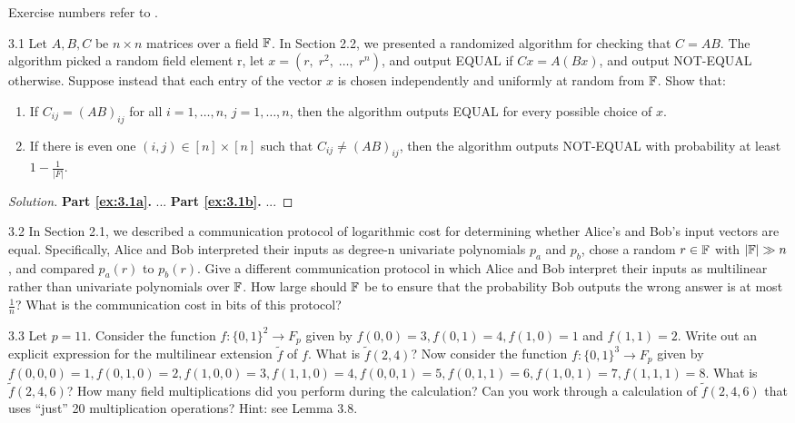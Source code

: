 
Exercise numbers refer to \cite{thaler2022pazk}.

\begin{exercise}{3.1}\label{ex:3.1}
    Let $A,B,C$ be $n \times n$ matrices over a field $\mathbb{F}$. In Section 2.2, we presented a randomized algorithm for checking that $C = AB$. The algorithm picked a random field element r, let $x = (r,\; r^2,\; \ldots,\; r^n)$, and output EQUAL if $Cx = A(Bx)$, and output NOT-EQUAL otherwise.
    Suppose instead that each entry of the vector $x$ is chosen independently and uniformly at random from $\mathbb{F}$. 
    Show that:
    \begin{enumerate}[label=(\alph*)]

        \item\label{ex3.1a} If $C_{ij} = (AB)_{ij}$ for all $i = 1, \ldots, n$, $j = 1, \ldots, n$,
            then the algorithm outputs EQUAL for every possible choice of $x$.
        \item\label{ex3.1b} If there is even one $(i,j) \in [n] \times [n]$ such that
            $C_{ij} \neq (AB)_{ij}$, then the algorithm outputs NOT-EQUAL with
            probability at least $1 - \frac{1}{|F|}$.
    \end{enumerate}
\end{exercise}

\begin{proof}[Solution]
    \textbf{Part \ref{ex:3.1a}.} ...
    \textbf{Part \ref{ex:3.1b}.} ...
\end{proof}

\begin{exercise}{3.2}\label{ex:3.2}
    In Section 2.1, we described a communication protocol of logarithmic cost for determining
    whether Alice’s and Bob’s input vectors are equal. Specifically, Alice and Bob interpreted their inputs as
    degree-n univariate polynomials $p_a$ and $p_b$, chose a random $r \in \mathbb{F}$ with $|\mathbb{F}| \gg n$, and compared $p_a(r)$ to
    $p_b(r)$. Give a different communication protocol in which Alice and Bob interpret their inputs as multilinear
    rather than univariate polynomials over $\mathbb{F}$. How large should $\mathbb{F}$ be to ensure that the probability Bob outputs
    the wrong answer is at most $\frac{1}{n}$? What is the communication cost in bits of this protocol?
\end{exercise}

\begin{exercise}{3.3}\label{ex:3.3}
    Let $p = 11$. Consider the function $f: \{0,1\}^2 \to F_p$ given by $f(0,0) = 3, f(0,1) = 4, f(1,0) = 1$ and $f(1,1) = 2$. 
    Write out an explicit expression for the multilinear extension $\tilde{f}$ of $f$. What is $\tilde{f}(2,4)$?
    Now consider the function $f: \{0,1\}^3 \to F_p$ given by $f(0,0,0) = 1, f(0,1,0) = 2, f(1,0,0) = 3, f(1,1,0) = 4, f(0,0,1) = 5, f(0,1,1) = 6, f(1,0,1) = 7, f(1,1,1) = 8$. What is $\tilde{f}(2,4,6)$? How many field
    multiplications did you perform during the calculation? Can you work through a calculation of $\tilde{f}(2,4,6)$ that uses “just” 20 multiplication operations? Hint: see Lemma 3.8.
\end{exercise}


